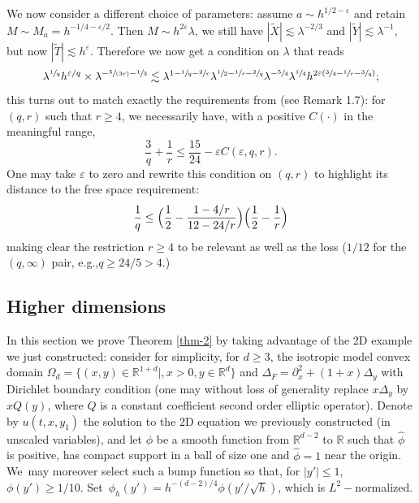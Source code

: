 \documentclass[11pt]{article}
\newcommand{\eg}{e.g.,\xspace}
\newcommand{\spfrac}[2]{\sfrac{#1}{(#2)}}
\theoremstyle{plain}
\theoremstyle{definition}
\begin{document}
\medskip
We now consider a different choice of parameters: assume $a\sim h^{1/2-\varepsilon}$ and retain $M\sim M_{a}=h^{-1/4-\varepsilon/2}$. Then $M\sim h^{2\varepsilon}\lambda$, we still have $|\tilde X|\lesssim \lambda^{-2/3}$ and $|\tilde Y|\lesssim \lambda^{-1}$, but now $|\tilde T|\lesssim h^{\varepsilon}$. Therefore we now get a condition on $\lambda$ that reads
\[
\lambda^{\sfrac 1 q}h^{\varepsilon/q} \times \lambda^{-\spfrac 5{3r}-\sfrac 1 3}
\lesssim \lambda^{1-\sfrac 1 q-\sfrac 2 r} \lambda^{\sfrac 1 2 -\sfrac 1 r -\sfrac 2 q} \lambda^{-\sfrac 5 4} \lambda^{\sfrac 1 {4}}h^{2\varepsilon(\sfrac 3 4 -\sfrac 1 r -\sfrac 3q)};
\]
this turns out to match exactly the requirements from \cite{doi} (see Remark 1.7): for $(q,r)$ such that $r\geq 4$, we necessarily have, with a positive $C(\cdot)$ in the meaningful range,
\[
\frac 3 q +\frac 1 r \leq \frac {15} {24}-\varepsilon C(\varepsilon,q,r).
\]
One may take $\varepsilon$ to zero and rewrite this condition on $(q,r)$ to highlight its distance to the free space requirement:
\begin{equation*}
\label{eq:doi2d}
\frac 1 q \leq \Bigl(\frac 1 2 -\frac {1-4/r}{12-24/r}\Bigr) \Bigl(\frac 1 2 -\frac 1 r\Bigr)
\end{equation*}
making clear the restriction $r\geq 4$ to be relevant as well as the loss ($1/12$ for the $(q,\infty)$ pair, \eg $q\geq 24/5>4$.)

\subsection{Higher dimensions}
In this section we prove Theorem \ref{thm-2} by taking advantage of the 2D example we just constructed: consider for simplicity, for $d\geq 3$, the isotropic model convex domain $\Omega_d=\{(x,y)\in\mathbb{R}^{1+d}|, x>0,y\in\mathbb{R}^{d}\}$ and
$\Delta_F=\partial^{2}_{x}+(1+x)\Delta_{y}$ with Dirichlet boundary condition (one may without loss of generality replace $x\Delta_{y}$ by $xQ(y)$, where $Q$ is a constant coefficient second order elliptic operator). Denote by $u(t,x,y_{1})$ the solution to the 2D equation we previously constructed (in unscaled variables), and let $\phi$ be a smooth function from $\mathbb{R}^{d-2}$ to $\mathbb{R}$ such that $\hat \phi$ is positive, has compact support in a ball of size one and $\hat \phi=1$ near the origin. We~may moreover select such a bump function so that, for $|y'|\leq 1$, $\phi(y')\geq 1/10$. Set~$\phi_{h}(y')= h^{-(d-2)/4}\phi(y'/\sqrt h)$, which is $L^{2}-$normalized.
\end{document}
